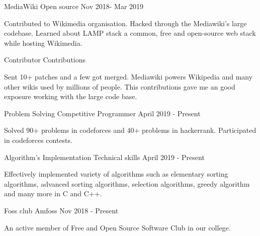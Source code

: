\documentclass[11pt, a4paper]{awesome-cv}
\begin{document}
\begin{cventries}
  \cventry
    {MediaWiki} %
    {Open source} %
    {} %
    {Nov 2018- Mar 2019} %
    {
      \begin{cvitems} %
        \item {Contributed to Wikimedia organisation.   Hacked through the Mediawiki's large codebase. Learned about LAMP stack a common, free and open-source web stack while hosting Wikimedia.
        }
      \end{cvitems}
    }

  \cventry
    {Contributor} %
    {Contributions} %
    {} %
    {} %
    {
      \begin{cvitems} %
        \item {Sent 10+ patches and a few got merged. Mediawiki powers Wikipedia and many other wikis used by millions of people. This contributions gave me an good exposure working with the large code base.}
      \end{cvitems}
    }

  \cventry
    {Problem Solving} %
    {Competitive Programmer} %
    {} %
    {April 2019 - Present} %
    {
      \begin{cvitems} %
        \item {Solved 90+ problems in codeforces and 40+ problems in hackerrank. Participated in codeforces contests. }
      \end{cvitems}
    }
   
   \cventry
    {Algorithm's Implementation} %
    {Technical skills} %
    {} %
    {April 2019 - Present} %
    {
      \begin{cvitems} %
        \item {Effectively implemented variety of algorithms such as elementary sorting algorithms, advanced sorting algorithms, selection algorithms, greedy algorithm and many more in C and C++. }
      \end{cvitems}
    }
    
  \cventry
    {Foss club} %
    {Amfoss} %
    {} %
    {Nov 2018 - Present} %
    {
      \begin{cvitems} %
        \item {An active member of Free and Open Source Software Club in our college.}
      \end{cvitems}
    }


\end{cventries}
\end{document}
